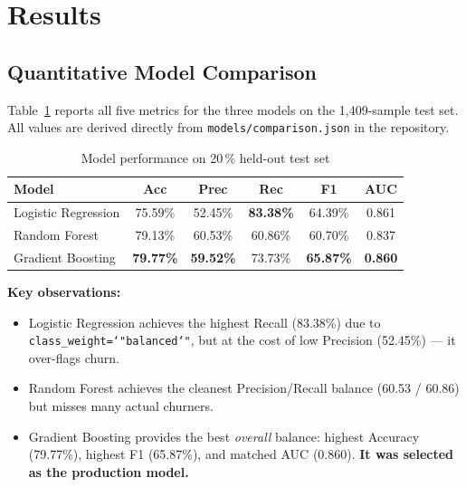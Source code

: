 \documentclass[conference]{IEEEtran}
\begin{document}
\section{Results}

\subsection{Quantitative Model Comparison}

Table~\ref{tab:comparison} reports all five metrics for the three models
on the 1,409-sample test set. All values are derived directly from
\texttt{models/comparison.json} in the repository.

\begin{table}[H]
\centering
\caption{Model performance on 20\,\% held-out test set}
\label{tab:comparison}
\renewcommand{\arraystretch}{1.2}
\begin{tabular}{lccccc}
\toprule
\textbf{Model} & \textbf{Acc} & \textbf{Prec} & \textbf{Rec}
               & \textbf{F1} & \textbf{AUC} \\
\midrule
Logistic Regression  & 75.59\% & 52.45\% & \textbf{83.38\%}
                     & 64.39\% & 0.861 \\
Random Forest        & 79.13\% & 60.53\% & 60.86\%
                     & 60.70\% & 0.837 \\
Gradient Boosting    & \textbf{79.77\%} & \textbf{59.52\%}
                     & 73.73\% & \textbf{65.87\%}
                     & \textbf{0.860} \\
\bottomrule
\end{tabular}
\end{table}

\textbf{Key observations:}
\begin{itemize}
  \item Logistic Regression achieves the highest Recall (83.38\%) due to
        \texttt{class\_weight=\char`"balanced\char`"}, but at the cost of
        low Precision (52.45\%) — it over-flags churn.
  \item Random Forest achieves the cleanest Precision/Recall balance
        (60.53 / 60.86) but misses many actual churners.
  \item Gradient Boosting provides the best \textit{overall} balance:
        highest Accuracy (79.77\%), highest F1 (65.87\%), and matched AUC
        (0.860). \textbf{It was selected as the production model.}
\end{itemize}
\end{document}
